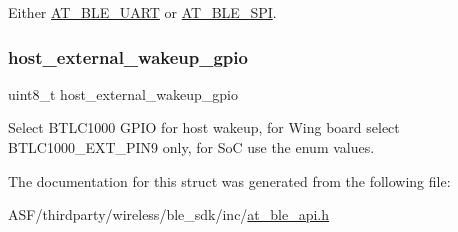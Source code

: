 Either \mbox{\hyperlink{at__ble__api_8h_a42bc6bd8b2502ca57a35ba77d29bad8ca8fe67bfab4b12ad57597bb27c46ebe1f}{A\+T\+\_\+\+B\+L\+E\+\_\+\+U\+A\+RT}} or \mbox{\hyperlink{at__ble__api_8h_a42bc6bd8b2502ca57a35ba77d29bad8ca9aa7efedf4d5a083f67fa25350141e24}{A\+T\+\_\+\+B\+L\+E\+\_\+\+S\+PI}}. 

\mbox{\label{structat__ble__bus__info__t_a935a87589314d156349378379263270c}} 
\subsubsection{\texorpdfstring{host\_external\_wakeup\_gpio}{host\_external\_wakeup\_gpio}}
{\footnotesize\ttfamily uint8\+\_\+t host\+\_\+external\+\_\+wakeup\+\_\+gpio}



Select B\+T\+L\+C1000 G\+P\+IO for host wakeup, for Wing board select B\+T\+L\+C1000\+\_\+\+E\+X\+T\+\_\+\+P\+I\+N9 only, for SoC use the enum values. 



The documentation for this struct was generated from the following file\+:\begin{DoxyCompactItemize}
\item 
A\+S\+F/thirdparty/wireless/ble\+\_\+sdk/inc/\mbox{\hyperlink{at__ble__api_8h}{at\+\_\+ble\+\_\+api.\+h}}\end{DoxyCompactItemize}
